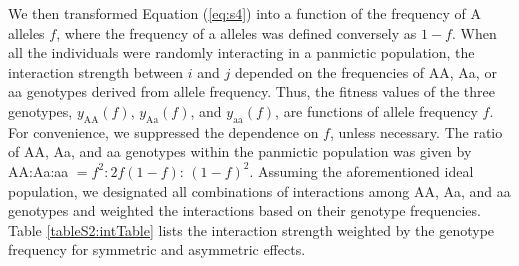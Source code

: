 \documentclass[12pt,]{article}
\begin{document}
We then transformed Equation (\ref{eq:s4}) into a function of the frequency of A alleles $f$, where the frequency of a alleles was defined conversely as $1-f$. When all the individuals were randomly interacting in a panmictic population, the interaction strength between $i$ and $j$ depended on the frequencies of AA, Aa, or aa genotypes derived from allele frequency. Thus, the fitness values of the three genotypes, $y_\mathrm{AA}(f)$, $y_\mathrm{Aa}(f)$, and $y_\mathrm{aa}(f)$, are functions of allele frequency $f$. For convenience, we suppressed the dependence on $f$, unless necessary. The ratio of AA, Aa, and aa genotypes within the panmictic population was given by AA:Aa:aa $=f^2: 2f(1-f)$: $(1-f)^2$. Assuming the aforementioned ideal population, we designated all combinations of interactions among AA, Aa, and aa genotypes and weighted the interactions based on their genotype frequencies. Table \ref{tableS2:intTable} lists the interaction strength weighted by the genotype frequency for symmetric and asymmetric effects. 
\end{document}
